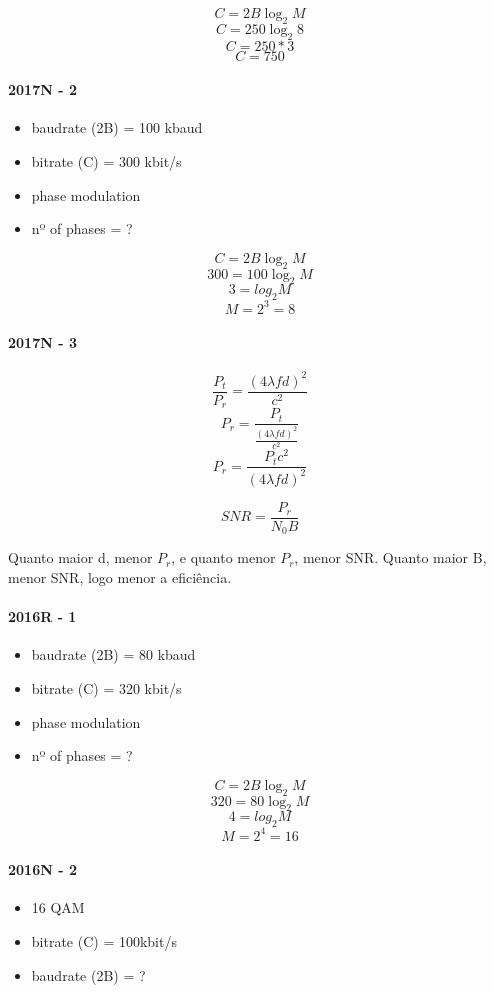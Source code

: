 \documentclass[../resumosRCOM.tex]{subfiles}
\begin{document}
\[C = 2B\log_2 M\]
\[C = 250\log_2 8\]
\[C = 250*3\]
\[C = 750\]

\paragraph{2017N - 2}
\begin{itemize}
    \item baudrate (2B) = 100 kbaud
    \item bitrate (C) = 300 kbit/s
    \item phase modulation
    \item nº of phases = ?
\end{itemize}

\[C = 2B\log_2 M\]
\[300 = 100\log_2 M\]
\[3 = log_2 M\]
\[M = 2^3 = 8\]

\paragraph{2017N - 3}
\[\frac{P_t}{P_r}=\frac{(4\lambda fd)^2}{c^2}\]
\[{P_r}=\frac{P_t}{\frac{(4\lambda fd)^2}{c^2}}\]
\[{P_r}=\frac{P_tc^2}{(4\lambda fd)^2}\]

\[SNR = \frac{P_r}{N_0B}\]


Quanto maior d, menor \(P_r\), e quanto menor \(P_r\), menor SNR.
Quanto maior B, menor SNR, logo menor a eficiência.

\paragraph{2016R - 1}
\begin{itemize}
    \item baudrate (2B) = 80 kbaud
    \item bitrate (C) = 320 kbit/s
    \item phase modulation
    \item nº of phases = ?
\end{itemize}

\[C = 2B\log_2 M\]
\[320 = 80\log_2 M\]
\[4 = log_2 M\]
\[M = 2^4 = 16\]

\paragraph{2016N - 2}
\begin{itemize}
    \item 16 QAM
    \item bitrate (C) = 100kbit/s
    \item baudrate (2B) = ?
\end{itemize}
\end{document}
